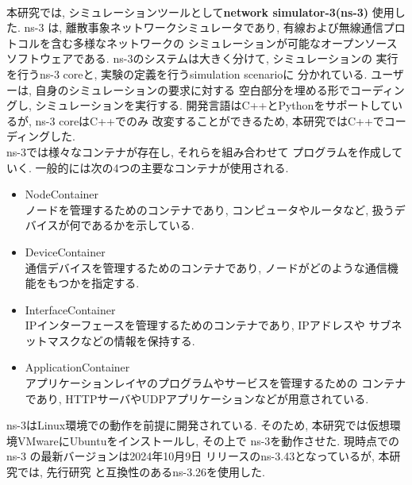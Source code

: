 \\[1em]
\indent 本研究では, シミュレーションツールとして\textbf{network simulator-3(ns-3)}
\cite{ns-3}使用した. ns-3 は, 離散事象ネットワークシミュレータであり, 
有線および無線通信プロトコルを含む多様なネットワークの
シミュレーションが可能なオープンソースソフトウェアである. 
ns-3のシステムは大きく分けて, シミュレーションの
実行を行うns-3 coreと, 実験の定義を行うsimulation scenarioに
分かれている. ユーザーは, 自身のシミュレーションの要求に対する
空白部分を埋める形でコーディングし, シミュレーションを実行する. 
開発言語はC++とPythonをサポートしているが, ns-3 coreはC++でのみ
改変することができるため, 本研究ではC++でコーディングした.\\
\indent ns-3では様々なコンテナが存在し, それらを組み合わせて
プログラムを作成していく. 一般的には次の4つの主要なコンテナが使用される.
\begin{itemize}
  \item NodeContainer\\ 
  \indent ノードを管理するためのコンテナであり, 
  コンピュータやルータなど, 扱うデバイスが何であるかを示している. 
  \item DeviceContainer\\
  \indent 通信デバイスを管理するためのコンテナであり, 
  ノードがどのような通信機能をもつかを指定する. 
  \item InterfaceContainer\\
  \indent IPインターフェースを管理するためのコンテナであり, IPアドレスや
  サブネットマスクなどの情報を保持する.
  \item ApplicationContainer\\
  \indent アプリケーションレイヤのプログラムやサービスを管理するための
  コンテナであり, HTTPサーバやUDPアプリケーションなどが用意されている.
\end{itemize}

ns-3はLinux環境での動作を前提に開発されている. そのため, 
本研究では仮想環境VMwareにUbuntuをインストールし, その上で
ns-3を動作させた. 現時点での ns-3 の最新バージョンは2024年10月9日
リリースのns-3.43となっているが, 本研究では, 先行研究
\cite{shinato}と互換性のあるns-3.26を使用した. \\[1em]


 
